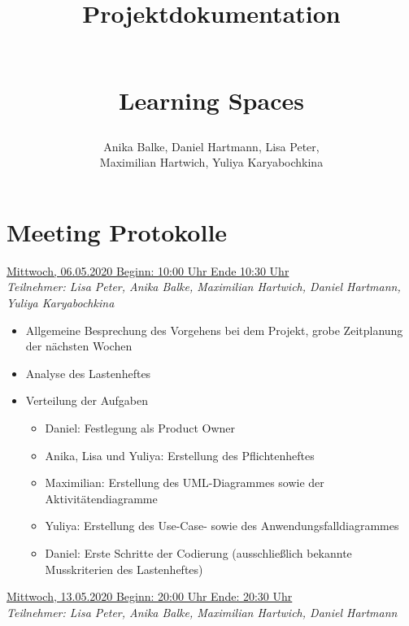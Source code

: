 \documentclass[a4paper,report,headsepline]{scrreprt}
\begin{document}
\title{ \begin{Huge}
\textbf{Projektdokumentation}
\end{Huge} \\  \dq Learning Spaces\dq}
\author{Anika Balke, Daniel Hartmann, Lisa Peter, \\ Maximilian Hartwich, Yuliya Karyabochkina}

\maketitle


\tableofcontents
\clearpage



\chapter{Meeting Protokolle}
\underline{{\large Mittwoch, 06.05.2020 Beginn: 10:00 Uhr Ende 10:30 Uhr}}  \\
\textit{Teilnehmer: Lisa Peter, Anika Balke, Maximilian Hartwich, Daniel Hartmann, Yuliya Karyabochkina}

 \begin{itemize}
  \item Allgemeine Besprechung des Vorgehens bei dem Projekt, grobe Zeitplanung der nächsten Wochen
 \item Analyse des Lastenheftes
 \item Verteilung der Aufgaben
 
 \begin{itemize}
 \item Daniel: Festlegung als Product Owner
 \item Anika, Lisa und Yuliya: Erstellung des Pflichtenheftes
 \item Maximilian: Erstellung des UML-Diagrammes sowie der Aktivitätendiagramme
 \item Yuliya: Erstellung des Use-Case- sowie des Anwendungsfalldiagrammes
 \item Daniel: Erste Schritte der Codierung (ausschließlich bekannte Musskriterien des Lastenheftes)
 
\end{itemize} 
\end{itemize}  
 \underline{{\large Mittwoch, 13.05.2020 Beginn: 20:00 Uhr Ende: 20:30 Uhr}}  \\
\textit{Teilnehmer: Lisa Peter, Anika Balke, Maximilian Hartwich, Daniel Hartmann}
\end{document}
